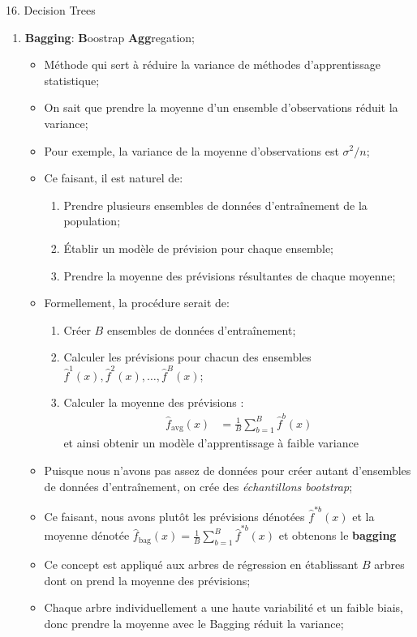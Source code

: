 \documentclass[12pt, titlepage, french]{report}
\begin{document}
\begin{CHPT_SUMM}[label = {DECISION-TREES}]{16. Decision Trees}
\begin{enumerate}
	\item[]	\textbf{Bagging}: \textbf{B}oostrap \textbf{Agg}regation;
		\begin{itemize}
		\item	Méthode qui sert à réduire la variance de méthodes d'apprentissage statistique;
		\item	On sait que prendre la moyenne d'un ensemble d'observations réduit la variance;
		\item[]	Pour exemple, la variance de la moyenne d'observations est $\sigma^{2}/n$;
		\item	Ce faisant, il est naturel de:
			\begin{enumerate}
			\item	Prendre plusieurs ensembles de données d'entraînement de la population;
			\item	Établir un modèle de prévision pour chaque ensemble;
			\item	Prendre la moyenne des prévisions résultantes de chaque moyenne;
			\end{enumerate}
		\item	Formellement, la procédure serait de:
			\begin{enumerate}
			\item	Créer $B$ ensembles de données d'entraînement;
			\item	Calculer les prévisions pour chacun des ensembles $\hat{f}^{1}(x), \hat{f}^{2}(x), \dots, \hat{f}^{B}(x)$;
			\item	Calculer la moyenne des prévisions :
			\begin{align*}
			\hat{f}_{\text{avg}}(x)	&=	\frac{1}{B} \sum_{b = 1}^{B} \hat{f}^{b}(x)
			\end{align*}
			et ainsi obtenir un modèle d'apprentissage à faible variance
			\end{enumerate}
		\item	Puisque nous n'avons pas assez de données pour créer autant d'ensembles de données d'entraînement, on crée des \textit{échantillons bootstrap};
		\item[]	Ce faisant, nous avons plutôt les prévisions dénotées $\hat{f}^{*b}(x)$ et la moyenne dénotée $\hat{f}_{\text{bag}}(x)	=	\frac{1}{B} \sum_{b = 1}^{B} \hat{f}^{*b}(x)$ et obtenons le \textbf{bagging}
		\item	Ce concept est appliqué aux arbres de régression en établissant $B$ arbres dont on prend la moyenne des prévisions;
		\item[]	Chaque arbre individuellement a une haute variabilité et un faible biais, donc prendre la moyenne avec le Bagging réduit la variance;

\end{itemize}
\end{enumerate}
\end{CHPT_SUMM}
\end{document}
